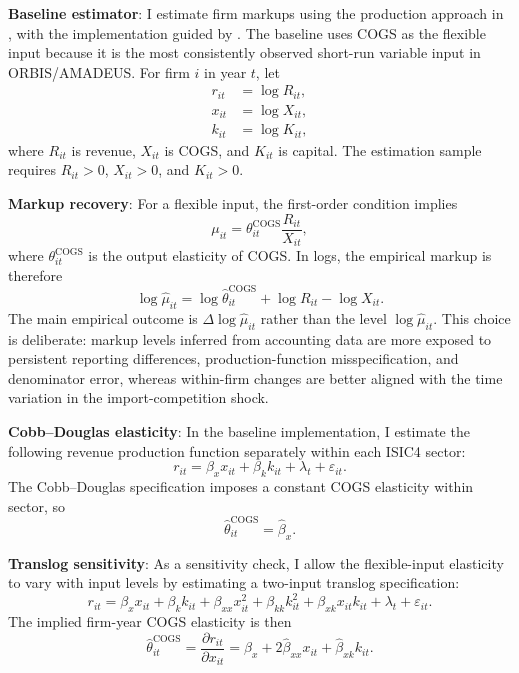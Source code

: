 ﻿\documentclass[12pt]{article}
\begin{document}
\textbf{Baseline estimator}: I estimate firm markups using the production approach in \textcite{deloeckerMarkupsFirmLevelExport2012}, with the implementation guided by \textcite{deridderHitchhikersGuideMarkup2026}. The baseline uses COGS as the flexible input because it is the most consistently observed short-run variable input in ORBIS/AMADEUS. For firm \(i\) in year \(t\), let
\begin{align*}
r_{it} &= \log R_{it}, \\
x_{it} &= \log X_{it}, \\
k_{it} &= \log K_{it},
\end{align*}
where \(R_{it}\) is revenue, \(X_{it}\) is COGS, and \(K_{it}\) is capital. The estimation sample requires \(R_{it}>0\), \(X_{it}>0\), and \(K_{it}>0\).

\textbf{Markup recovery}: For a flexible input, the first-order condition implies
\[
\mu_{it}
=
\theta_{it}^{\text{COGS}} \frac{R_{it}}{X_{it}},
\]
where \(\theta_{it}^{\text{COGS}}\) is the output elasticity of COGS. In logs, the empirical markup is therefore
\[
\log \hat{\mu}_{it}
=
\log \hat{\theta}_{it}^{\text{COGS}}
+ \log R_{it}
- \log X_{it}.
\]
The main empirical outcome is \(\Delta \log \hat{\mu}_{it}\) rather than the level \(\log \hat{\mu}_{it}\). This choice is deliberate: markup levels inferred from accounting data are more exposed to persistent reporting differences, production-function misspecification, and denominator error, whereas within-firm changes are better aligned with the time variation in the import-competition shock.

\textbf{Cobb--Douglas elasticity}: In the baseline implementation, I estimate the following revenue production function separately within each ISIC4 sector:
\[
r_{it}
=
\beta_x x_{it}
+ \beta_k k_{it}
+ \lambda_t
+ \varepsilon_{it}.
\]
The Cobb--Douglas specification imposes a constant COGS elasticity within sector, so
\[
\hat{\theta}_{it}^{\text{COGS}} = \hat{\beta}_x.
\]

\textbf{Translog sensitivity}: As a sensitivity check, I allow the flexible-input elasticity to vary with input levels by estimating a two-input translog specification:
\[
r_{it}
=
\beta_x x_{it}
+ \beta_k k_{it}
+ \beta_{xx} x_{it}^2
+ \beta_{kk} k_{it}^2
+ \beta_{xk}x_{it}k_{it}
+ \lambda_t
+ \varepsilon_{it}.
\]
The implied firm-year COGS elasticity is then
\[
\hat{\theta}_{it}^{\text{COGS}}
=
\frac{\partial r_{it}}{\partial x_{it}}
=
\hat{\beta}_x
+ 2\hat{\beta}_{xx}x_{it}
+ \hat{\beta}_{xk}k_{it}.
\]
\end{document}
